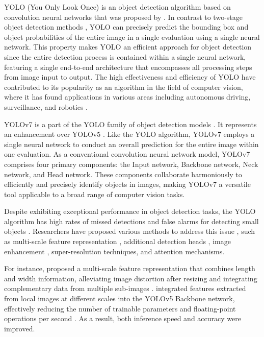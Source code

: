 \documentclass[aic]{iosart2x}
\begin{document}
YOLO (You Only Look Once) is an object detection algorithm based on convolution neural networks that was proposed by \cite{Redmon_2016}. In contrast to two-stage object detection methods \cite{Long_2015, Liu_2016, Law_2019, Wang_2021}, YOLO can precisely predict the bounding box and object probabilities of the entire image in a single evaluation using a single neural network. This property makes YOLO an efficient approach for object detection since the entire detection process is contained within a single neural network, featuring a single end-to-end architecture that encompasses all processing steps from image input to output. The high effectiveness and efficiency of YOLO have contributed to its popularity as an algorithm in the field of computer vision, where it has found applications in various areas including autonomous driving, surveillance, and robotics \cite{li2022cross-domain}.

YOLOv7 is a part of the YOLO family of object detection models \cite{WangBochkovskiy-212}. It represents an enhancement over YOLOv5 \cite{JocherChaurasia-220}. Like the YOLO algorithm, YOLOv7 employs a single neural network to conduct an overall prediction for the entire image within one evaluation. As a conventional convolution neural network model, YOLOv7 comprises four primary components: the Input network, Backbone network, Neck network, and Head network. These components collaborate harmoniously to efficiently and precisely identify objects in images, making YOLOv7 a versatile tool applicable to a broad range of computer vision tasks.

Despite exhibiting exceptional performance in object detection tasks, the YOLO algorithm has high rates of missed detections and false alarms for detecting small objects \cite{Jiang_2022_08, Li_2023, Hu_2021}. Researchers have proposed various methods to address this issue \cite{Liu_2021_06}, such as multi-scale feature representation \cite{Newell_2016, Hong2016, Najibi_2017, Wu_2018, Najibi_2019}, additional detection heads \cite{Zhu_2021,Deng_2022}, image enhancement \cite{Rabbi_2020}, super-resolution techniques, and attention mechanisms.

For instance, \citeauthor{Hsu_2021} proposed a multi-scale feature representation that combines length and width information, alleviating image distortion after resizing and integrating complementary data from multiple sub-images \cite{Hsu_2021}.  \citeauthor{Padilla_Carrasco_2023} integrated features extracted from local images at different scales into the YOLOv5 Backbone network, effectively reducing the number of trainable parameters and floating-point operations per second \cite{Padilla_Carrasco_2023}. As a result, both inference speed and accuracy were improved.
\end{document}
